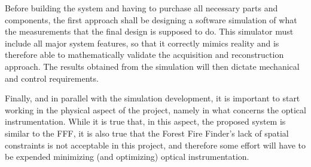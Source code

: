 Before building the system and having to purchase all necessary parts
and components, the first approach shall be designing a software
simulation of what the measurements that the final design is supposed to
do. This simulator must include all major system features, so that it
correctly mimics reality and is therefore able to mathematically
validate the acquisition and reconstruction approach. The results
obtained from the simulation will then dictate mechanical and control
requirements.

Finally, and in parallel with the simulation development, it is
important to start working in the physical aspect of the project, namely
in what concerns the optical instrumentation. While it is true that, in
this aspect, the proposed system is similar to the \gls{FFF}, it is also
true that the Forest Fire Finder's lack of spatial constraints is not
acceptable in this project, and therefore some effort will have to be
expended minimizing (and optimizing) optical instrumentation.
